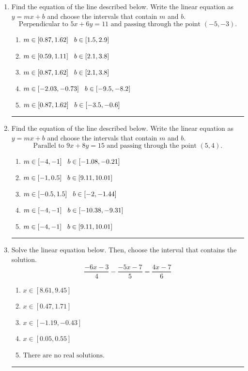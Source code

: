 \documentclass[14pt]{extbook}
\newcommand{\litem}[1]{\item#1\hspace*{-1cm}\rule{\textwidth}{0.4pt}}
\begin{document}
\begin{enumerate}
{\begin{enumerate}[label=\Alph*.]
\end{enumerate} }
\litem{
Find the equation of the line described below. Write the linear equation as $ y=mx+b $ and choose the intervals that contain $m$ and $b$.\[ \text{Perpendicular to } 5 x + 6 y = 11 \text{ and passing through the point } (-5, -3). \]\begin{enumerate}[label=\Alph*.]
\item \( m \in [0.87, 1.62] \hspace*{3mm} b \in [1.5, 2.9] \)
\item \( m \in [0.59, 1.11] \hspace*{3mm} b \in [2.1, 3.8] \)
\item \( m \in [0.87, 1.62] \hspace*{3mm} b \in [2.1, 3.8] \)
\item \( m \in [-2.03, -0.73] \hspace*{3mm} b \in [-9.5, -8.2] \)
\item \( m \in [0.87, 1.62] \hspace*{3mm} b \in [-3.5, -0.6] \)

\end{enumerate} }
\litem{
Find the equation of the line described below. Write the linear equation as $ y=mx+b $ and choose the intervals that contain $m$ and $b$.\[ \text{Parallel to } 9 x + 8 y = 15 \text{ and passing through the point } (5, 4). \]\begin{enumerate}[label=\Alph*.]
\item \( m \in [-4, -1] \hspace*{3mm} b \in [-1.08, -0.21] \)
\item \( m \in [-1, 0.5] \hspace*{3mm} b \in [9.11, 10.01] \)
\item \( m \in [-0.5, 1.5] \hspace*{3mm} b \in [-2, -1.44] \)
\item \( m \in [-4, -1] \hspace*{3mm} b \in [-10.38, -9.31] \)
\item \( m \in [-4, -1] \hspace*{3mm} b \in [9.11, 10.01] \)

\end{enumerate} }
\litem{
Solve the linear equation below. Then, choose the interval that contains the solution.\[ \frac{-6x -3}{4} - \frac{-5x -7}{5} = \frac{4x -7}{6} \]\begin{enumerate}[label=\Alph*.]
\item \( x \in [8.61, 9.45] \)
\item \( x \in [0.47, 1.71] \)
\item \( x \in [-1.19, -0.43] \)
\item \( x \in [0.05, 0.55] \)
\item \( \text{There are no real solutions.} \)


\end{enumerate}}
\end{enumerate}
\end{document}
